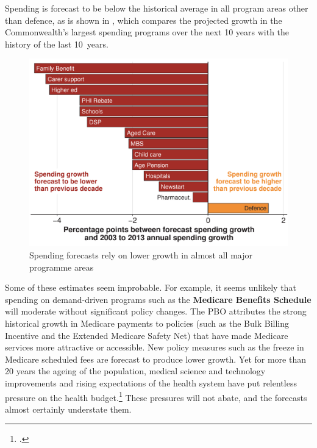 \documentclass[continuous]{grattan}
\begin{document}
Spending is forecast to be below the historical average in all program areas other than defence, as is shown in , which compares the projected growth in the Commonwealth’s largest spending programs over the next 10 years with the history of the last 10~years. 

\begin{figure}
\caption{Spending forecasts rely on lower growth in almost all major programme areas\label{fig:FISCAL-8}}%
\includegraphics[width=\columnwidth]{figure/budget-repair-Figure8-altered-1.pdf}
\end{figure}

Some of these estimates seem improbable. For example, it seems unlikely that spending on demand-driven programs such as the \textbf{Medicare Benefits Schedule} will moderate without significant policy changes. The PBO attributes the strong historical growth in Medicare payments to policies (such as the Bulk Billing Incentive and the Extended Medicare Safety Net) that have made Medicare services more attractive or accessible. New policy measures such as the freeze in Medicare scheduled fees are forecast to produce lower growth. Yet for more than 20 years the ageing of the population, medical science and technology improvements and rising expectations of the health system have put relentless pressure on the health budget.\footcite{Daley2014}  These pressures will not abate, and the forecasts almost certainly understate them.
\end{document}
